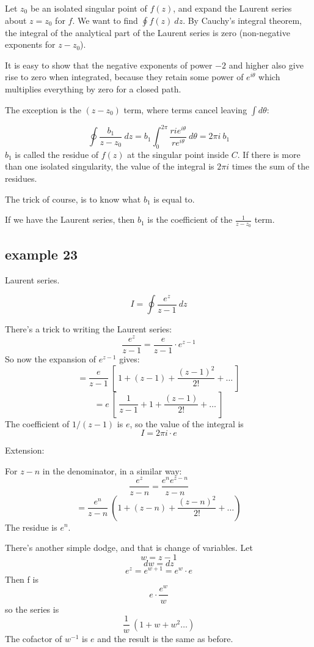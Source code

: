 \documentclass[11pt, oneside]{article}
\begin{document}
Let $z_0$ be an isolated singular point of $f(z)$, and expand the Laurent series about $z = z_0$ for $f$.  We want to find $\oint f(z) \ dz$.  By Cauchy's integral theorem, the integral of the analytical part of the Laurent series is zero (non-negative exponents for $z - z_0$).

It is easy to show that the negative exponents of power $-2$ and higher also give rise to zero when integrated, because they retain some power of $e^{i \theta}$ which multiplies everything by zero for a closed path.

The exception is the $(z-z_0)$ term, where terms cancel leaving $\int d \theta$:

\[ \oint \frac{b_1}{z - z_0} \ dz = b_1 \int_0^{2 \pi} \frac{ri e^{i \theta}}{r e^{i \theta}} \ d \theta = 2 \pi i \ b_1 \]
$b_1$ is called the residue of $f(z)$ at the singular point inside $C$.  If there is more than one isolated singularity, the value of the integral is $2 \pi i$ times the sum of the residues.

The trick of course, is to know what $b_1$ is equal to.

If we have the Laurent series, then $b_1$ is the coefficient of the $\frac{1}{z - z_0}$ term.

\subsection*{example 23}

Laurent series.

\label{sec:ex23L}

\[ I = \oint \frac{e^z}{z - 1} \ dz \]

There's a trick to writing the Laurent series:
\[ \frac{e^z}{z - 1} = \frac{e}{z - 1} \cdot e^{z - 1} \]
So now the expansion of $e^{z -1}$ gives:
\[ = \frac{e}{z - 1} \ [ \ 1 + (z - 1) + \frac{(z-1)^2}{2!} + \dots \ ]  \]
\[ = e \ [ \ \frac{1}{z - 1} + 1 + \frac{(z-1)}{2!} + \dots \ ]  \]
The coefficient of $1/(z-1)$ is $e$, so the value of the integral is
\[ I = 2 \pi i \cdot e \]

Extension:

For $z - n$ in the denominator, in a similar way:
\[ \frac{e^z}{z - n} = \frac{e^n e^{z -n}}{z - n} \]
\[ = \frac{e^n}{z - n} \ ( 1 + (z - n) + \frac{(z - n)^2}{2!} + \dots ) \]
The residue is $e^n$.

There's another simple dodge, and that is change of variables.  Let
\[ w = z - 1\]
\[ dw = dz \]
\[ e^z = e^{w + 1} = e^w \cdot e \]
Then f is
\[ e \cdot \frac{e^w}{w} \]
so the series is 
\[ \frac{1}{w} \ (1 + w + w^2 \dots ) \]
The cofactor of $w^{-1}$ is $e$ and the result is the same as before.
\end{document}
